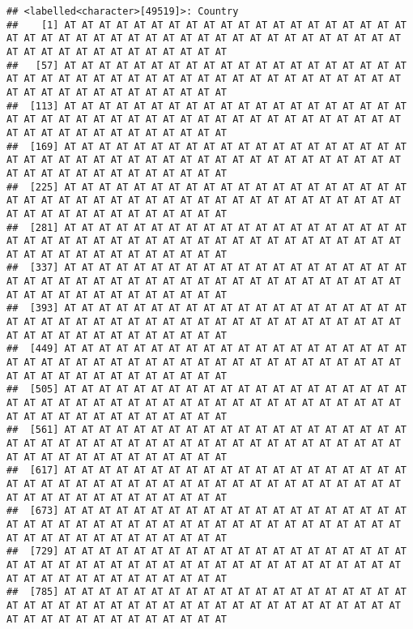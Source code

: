 \documentclass[
]{book}
\begin{document}
\begin{verbatim}
## <labelled<character>[49519]>: Country
##    [1] AT AT AT AT AT AT AT AT AT AT AT AT AT AT AT AT AT AT AT AT AT AT AT AT AT AT AT AT AT AT AT AT AT AT AT AT AT AT AT AT AT AT AT AT AT AT AT AT AT AT AT AT AT AT AT AT
##   [57] AT AT AT AT AT AT AT AT AT AT AT AT AT AT AT AT AT AT AT AT AT AT AT AT AT AT AT AT AT AT AT AT AT AT AT AT AT AT AT AT AT AT AT AT AT AT AT AT AT AT AT AT AT AT AT AT
##  [113] AT AT AT AT AT AT AT AT AT AT AT AT AT AT AT AT AT AT AT AT AT AT AT AT AT AT AT AT AT AT AT AT AT AT AT AT AT AT AT AT AT AT AT AT AT AT AT AT AT AT AT AT AT AT AT AT
##  [169] AT AT AT AT AT AT AT AT AT AT AT AT AT AT AT AT AT AT AT AT AT AT AT AT AT AT AT AT AT AT AT AT AT AT AT AT AT AT AT AT AT AT AT AT AT AT AT AT AT AT AT AT AT AT AT AT
##  [225] AT AT AT AT AT AT AT AT AT AT AT AT AT AT AT AT AT AT AT AT AT AT AT AT AT AT AT AT AT AT AT AT AT AT AT AT AT AT AT AT AT AT AT AT AT AT AT AT AT AT AT AT AT AT AT AT
##  [281] AT AT AT AT AT AT AT AT AT AT AT AT AT AT AT AT AT AT AT AT AT AT AT AT AT AT AT AT AT AT AT AT AT AT AT AT AT AT AT AT AT AT AT AT AT AT AT AT AT AT AT AT AT AT AT AT
##  [337] AT AT AT AT AT AT AT AT AT AT AT AT AT AT AT AT AT AT AT AT AT AT AT AT AT AT AT AT AT AT AT AT AT AT AT AT AT AT AT AT AT AT AT AT AT AT AT AT AT AT AT AT AT AT AT AT
##  [393] AT AT AT AT AT AT AT AT AT AT AT AT AT AT AT AT AT AT AT AT AT AT AT AT AT AT AT AT AT AT AT AT AT AT AT AT AT AT AT AT AT AT AT AT AT AT AT AT AT AT AT AT AT AT AT AT
##  [449] AT AT AT AT AT AT AT AT AT AT AT AT AT AT AT AT AT AT AT AT AT AT AT AT AT AT AT AT AT AT AT AT AT AT AT AT AT AT AT AT AT AT AT AT AT AT AT AT AT AT AT AT AT AT AT AT
##  [505] AT AT AT AT AT AT AT AT AT AT AT AT AT AT AT AT AT AT AT AT AT AT AT AT AT AT AT AT AT AT AT AT AT AT AT AT AT AT AT AT AT AT AT AT AT AT AT AT AT AT AT AT AT AT AT AT
##  [561] AT AT AT AT AT AT AT AT AT AT AT AT AT AT AT AT AT AT AT AT AT AT AT AT AT AT AT AT AT AT AT AT AT AT AT AT AT AT AT AT AT AT AT AT AT AT AT AT AT AT AT AT AT AT AT AT
##  [617] AT AT AT AT AT AT AT AT AT AT AT AT AT AT AT AT AT AT AT AT AT AT AT AT AT AT AT AT AT AT AT AT AT AT AT AT AT AT AT AT AT AT AT AT AT AT AT AT AT AT AT AT AT AT AT AT
##  [673] AT AT AT AT AT AT AT AT AT AT AT AT AT AT AT AT AT AT AT AT AT AT AT AT AT AT AT AT AT AT AT AT AT AT AT AT AT AT AT AT AT AT AT AT AT AT AT AT AT AT AT AT AT AT AT AT
##  [729] AT AT AT AT AT AT AT AT AT AT AT AT AT AT AT AT AT AT AT AT AT AT AT AT AT AT AT AT AT AT AT AT AT AT AT AT AT AT AT AT AT AT AT AT AT AT AT AT AT AT AT AT AT AT AT AT
##  [785] AT AT AT AT AT AT AT AT AT AT AT AT AT AT AT AT AT AT AT AT AT AT AT AT AT AT AT AT AT AT AT AT AT AT AT AT AT AT AT AT AT AT AT AT AT AT AT AT AT AT AT AT AT AT AT AT

\end{verbatim}
\end{document}
